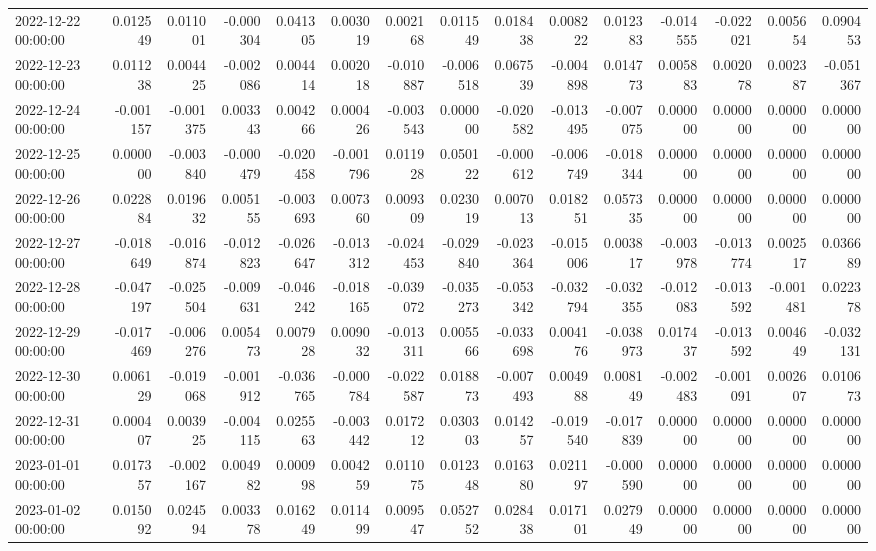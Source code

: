 \begin{tabular}{lrrrrrrrrrrrrrr}
2022-12-22 00:00:00 & 0.012549 & 0.011001 & -0.000304 & 0.041305 & 0.003019 & 0.002168 & 0.011549 & 0.018438 & 0.008222 & 0.012383 & -0.014555 & -0.022021 & 0.005654 & 0.090453 \\
2022-12-23 00:00:00 & 0.011238 & 0.004425 & -0.002086 & 0.004414 & 0.002018 & -0.010887 & -0.006518 & 0.067539 & -0.004898 & 0.014773 & 0.005883 & 0.002078 & 0.002387 & -0.051367 \\
2022-12-24 00:00:00 & -0.001157 & -0.001375 & 0.003343 & 0.004266 & 0.000426 & -0.003543 & 0.000000 & -0.020582 & -0.013495 & -0.007075 & 0.000000 & 0.000000 & 0.000000 & 0.000000 \\
2022-12-25 00:00:00 & 0.000000 & -0.003840 & -0.000479 & -0.020458 & -0.001796 & 0.011928 & 0.050122 & -0.000612 & -0.006749 & -0.018344 & 0.000000 & 0.000000 & 0.000000 & 0.000000 \\
2022-12-26 00:00:00 & 0.022884 & 0.019632 & 0.005155 & -0.003693 & 0.007360 & 0.009309 & 0.023019 & 0.007013 & 0.018251 & 0.057335 & 0.000000 & 0.000000 & 0.000000 & 0.000000 \\
2022-12-27 00:00:00 & -0.018649 & -0.016874 & -0.012823 & -0.026647 & -0.013312 & -0.024453 & -0.029840 & -0.023364 & -0.015006 & 0.003817 & -0.003978 & -0.013774 & 0.002517 & 0.036689 \\
2022-12-28 00:00:00 & -0.047197 & -0.025504 & -0.009631 & -0.046242 & -0.018165 & -0.039072 & -0.035273 & -0.053342 & -0.032794 & -0.032355 & -0.012083 & -0.013592 & -0.001481 & 0.022378 \\
2022-12-29 00:00:00 & -0.017469 & -0.006276 & 0.005473 & 0.007928 & 0.009032 & -0.013311 & 0.005566 & -0.033698 & 0.004176 & -0.038973 & 0.017437 & -0.013592 & 0.004649 & -0.032131 \\
2022-12-30 00:00:00 & 0.006129 & -0.019068 & -0.001912 & -0.036765 & -0.000784 & -0.022587 & 0.018873 & -0.007493 & 0.004988 & 0.008149 & -0.002483 & -0.001091 & 0.002607 & 0.010673 \\
2022-12-31 00:00:00 & 0.000407 & 0.003925 & -0.004115 & 0.025563 & -0.003442 & 0.017212 & 0.030303 & 0.014257 & -0.019540 & -0.017839 & 0.000000 & 0.000000 & 0.000000 & 0.000000 \\
2023-01-01 00:00:00 & 0.017357 & -0.002167 & 0.004982 & 0.000998 & 0.004259 & 0.011075 & 0.012348 & 0.016380 & 0.021197 & -0.000590 & 0.000000 & 0.000000 & 0.000000 & 0.000000 \\
2023-01-02 00:00:00 & 0.015092 & 0.024594 & 0.003378 & 0.016249 & 0.011499 & 0.009547 & 0.052752 & 0.028438 & 0.017101 & 0.027949 & 0.000000 & 0.000000 & 0.000000 & 0.000000 \\

\end{tabular}

